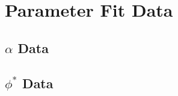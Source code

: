 \section{Parameter Fit Data} %
\label{app:parameter_fit_data}
	\subsection{$\alpha$ Data} %
	\label{sub:alpha_data}


	\subsection{$\phi^{*}$ Data} %
	\label{sub:phi_data}


